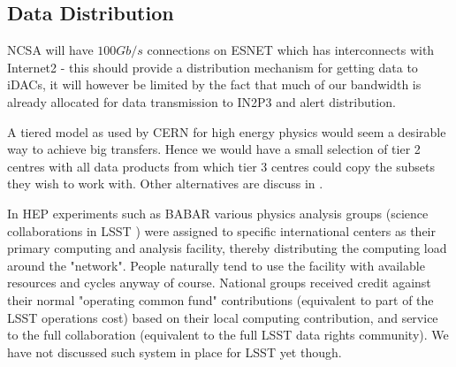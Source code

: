 \subsection{Data Distribution} \label{sec:dist}

NCSA will have $100Gb/s$ connections  on ESNET which has interconnects with Internet2 - this should provide a distribution mechanism for getting data to iDACs, it will however be limited by the fact that much of our bandwidth is already allocated for data transmission to IN2P3 and alert distribution.

A tiered model as used by CERN for high energy physics would seem a desirable way to achieve big transfers. Hence we would have a small selection of tier 2 centres with all data products from which tier 3 centres could copy the subsets they wish to work with.  Other alternatives are discuss in .

In HEP experiments such as  BABAR various physics analysis groups (science collaborations in LSST ) were assigned to specific international centers as their primary computing and analysis facility, thereby distributing the computing load around the "network". People naturally tend to use the facility with available resources and cycles anyway of course.
National groups received credit against their normal "operating common fund" contributions (equivalent to part of the LSST operations cost) based on their local computing contribution, and service to the full collaboration (equivalent to the full LSST data rights community).
We have not discussed  such system in place for LSST yet though.
~



